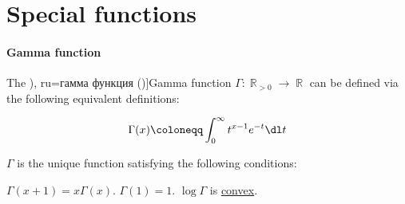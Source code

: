 \section{Special functions}\label{sec:special_functions}

\paragraph{Gamma function}

\begin{definition}\label{def:gamma_function}
  The \term[bg=гама (функция) (\cite[280]{Тагамлицки1978ИнтегралноСмятане}), ru=гамма функция (\cite[406]{Зорич2019АнализЧасть2})]{Gamma function} \( \Gamma: \BbbR_{>0} \to \BbbR \) can be defined via the following equivalent definitions:
  \begin{thmenum}
    \begin{equation}\label{eq:def:gamma_function/direct}
      \Gamma(x) \coloneqq \int_0^\infty t^{x-1} e^{-t} \dl t
    \end{equation}

     \( \Gamma \) is the unique function satisfying the following conditions:
    \begin{thmenum}
       \( \Gamma(x + 1) = x \Gamma(x) \).
       \( \Gamma(1) = 1 \).
       \( \log \Gamma \) is \hyperref[def:convex_function]{convex}.
    \end{thmenum}
  \end{thmenum}
\end{definition}

